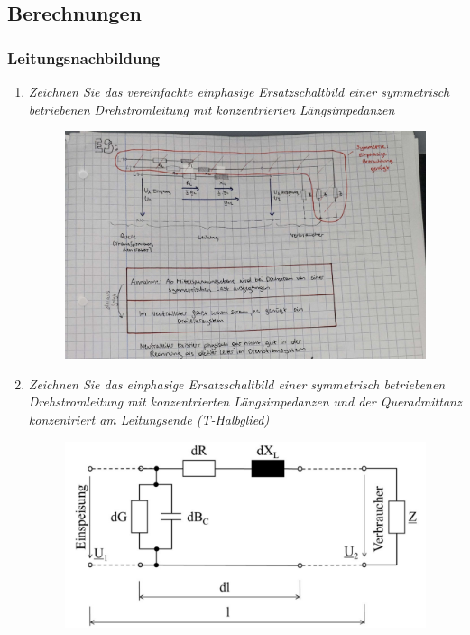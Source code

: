 \documentclass[12pt]{article}
\begin{document}
\subsection{Berechnungen}
\subsubsection{Leitungsnachbildung}

\clearpage

\begin{enumerate}
    \item \textit{Zeichnen Sie das vereinfachte einphasige 
    Ersatzschaltbild einer symmetrisch betriebenen 
    Drehstromleitung mit konzentrierten 
    Längsimpedanzen}\\
    \begin{figure}[h]
        \includegraphics[width=\textwidth]{figures/Schaltbild.jpg}
        \centering
    \end{figure}
    \clearpage
    \item \textit{Zeichnen Sie das einphasige Ersatzschaltbild einer 
    symmetrisch betriebenen Drehstromleitung mit 
    konzentrierten Längsimpedanzen und der 
    Queradmittanz konzentriert am Leitungsende (T-Halbglied)}\\
    \begin{figure}[h]
        \includegraphics[width=\textwidth]{figures/T-Halbglied.PNG}
        \centering
    \end{figure}
    \clearpage
    

\end{enumerate}
\end{document}
